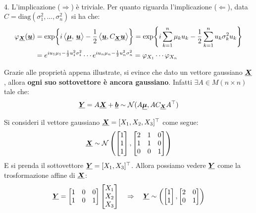 \begin{proposizione}
\begin{dimostrazione}
\begin{align*}
        \end{align*}
        4. L'implicazione ($\Rightarrow$) è triviale. Per quanto riguarda l'implicazione ($\Leftarrow$), data $C = \text{diag}(\sigma_1^2, ..., \sigma_n^2)$ si ha che:
        \begin{align*}
        \varphi_{\underline{{\boldsymbol{X}}}} (\underline{{\boldsymbol{u}}}) & = \exp\!\left\{i\left\langle \underline{{\boldsymbol{\mu}}},\, \underline{{\boldsymbol{u}}} \right\rangle-\frac{1}{2}\left\langle\underline{{\boldsymbol{u}}}, C_{\underline{{\boldsymbol{X}}}}\underline{{\boldsymbol{u}}}\right\rangle \right\} = \exp\!\left\{i\sum_{k=1}^n \mu_k u_k - \frac{1}{2}\sum_{k=1}^n u_k\sigma_k^2 u_k \right\} \\
        & = e^{iu_1\mu_1 - \frac{1}{2} u_1^2 \sigma_1^2}\cdots e^{iu_n\mu_n- \frac{1}{2} u_n^2 \sigma_n^2} = \varphi_{X_1}\cdots\varphi_{X_n}
        \end{align*}
    \end{dimostrazione}
\end{proposizione}

Grazie alle proprietà appena illustrate, si evince che dato un vettore gaussiano $\underline{{\boldsymbol{X}}}$, allora \textbf{ogni suo sottovettore è ancora gaussiano}. Infatti $\exists A\in M(n\times n)$ tale che:
\[\underline{{\boldsymbol{Y}}}  = A\underline{{\boldsymbol{X}}} + \underline{{\boldsymbol{b}}}\sim \mathcal{N}(A\underline{{\boldsymbol{\mu}}}, AC_{\underline{{\boldsymbol{X}}}}A^\top)\]

\begin{esempio}
    Si consideri il vettore gaussiano $\underline{{\boldsymbol{X}}} = [X_1, X_2, X_3]^\top$ come segue:
\[\underline{{\boldsymbol{X}}}\sim\mathcal{N}\left(\begin{bmatrix} 1\\1\\1\end{bmatrix}, \begin{bmatrix}
    2 & 1 & 0\\
    1 & 1 & 0\\
    0 & 0 & 1
\end{bmatrix}\right)\]
E si prenda il sottovettore $\underline{{\boldsymbol{Y}}} = [X_1, X_3]^\top$. Allora possiamo vedere $\underline{{\boldsymbol{Y}}}$ come la trosformazione affine di $\underline{{\boldsymbol{X}}}$:
\[\underline{{\boldsymbol{Y}}} = \begin{bmatrix}
    1 & 0 & 0\\
    1 & 0 & 1\\
    \end{bmatrix} \begin{bmatrix} X_1\\X_2\\X_3 \end{bmatrix} \quad \Rightarrow \quad \underline{{\boldsymbol{Y}}}\sim \left(\begin{bmatrix}1\\1\end{bmatrix}, \begin{bmatrix}
    2 & 0 \\
    0 & 1 \\
    \end{bmatrix}\right)\]
\end{esempio}

